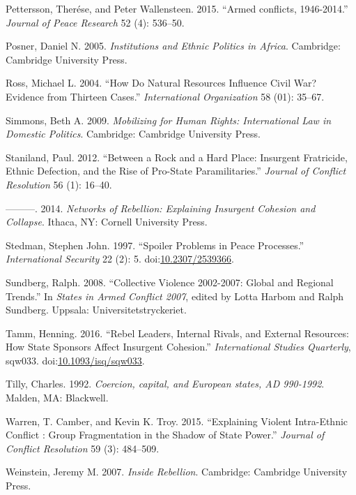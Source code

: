 \documentclass[12pt,]{book}
\theoremstyle{definition}
\theoremstyle{definition}
\theoremstyle{remark}
\begin{document}
\hypertarget{ref-Pettersson2015a}{}
Pettersson, Therése, and Peter Wallensteen. 2015. ``Armed conflicts,
1946-2014.'' \emph{Journal of Peace Research} 52 (4): 536--50.

\hypertarget{ref-Posner2005}{}
Posner, Daniel N. 2005. \emph{Institutions and Ethnic Politics in
Africa}. Cambridge: Cambridge University Press.

\hypertarget{ref-Ross2004e}{}
Ross, Michael L. 2004. ``How Do Natural Resources Influence Civil War?
Evidence from Thirteen Cases.'' \emph{International Organization} 58
(01): 35--67.

\hypertarget{ref-simmons09}{}
Simmons, Beth A. 2009. \emph{Mobilizing for Human Rights: International
Law in Domestic Politics}. Cambridge: Cambridge University Press.

\hypertarget{ref-Staniland2012d}{}
Staniland, Paul. 2012. ``Between a Rock and a Hard Place: Insurgent
Fratricide, Ethnic Defection, and the Rise of Pro-State
Paramilitaries.'' \emph{Journal of Conflict Resolution} 56 (1): 16--40.

\hypertarget{ref-Staniland2014}{}
---------. 2014. \emph{Networks of Rebellion: Explaining Insurgent
Cohesion and Collapse}. Ithaca, NY: Cornell University Press.

\hypertarget{ref-Stedman1997}{}
Stedman, Stephen John. 1997. ``Spoiler Problems in Peace Processes.''
\emph{International Security} 22 (2): 5.
doi:\href{https://doi.org/10.2307/2539366}{10.2307/2539366}.

\hypertarget{ref-Sundberg2008a}{}
Sundberg, Ralph. 2008. ``Collective Violence 2002-2007: Global and
Regional Trends.'' In \emph{States in Armed Conflict 2007}, edited by
Lotta Harbom and Ralph Sundberg. Uppsala: Universitetstryckeriet.

\hypertarget{ref-Tamm2016}{}
Tamm, Henning. 2016. ``Rebel Leaders, Internal Rivals, and External
Resources: How State Sponsors Affect Insurgent Cohesion.''
\emph{International Studies Quarterly}, sqw033.
doi:\href{https://doi.org/10.1093/isq/sqw033}{10.1093/isq/sqw033}.

\hypertarget{ref-Tilly1992}{}
Tilly, Charles. 1992. \emph{Coercion, capital, and European states, AD
990-1992}. Malden, MA: Blackwell.

\hypertarget{ref-Warren2015}{}
Warren, T. Camber, and Kevin K. Troy. 2015. ``Explaining Violent
Intra-Ethnic Conflict : Group Fragmentation in the Shadow of State
Power.'' \emph{Journal of Conflict Resolution} 59 (3): 484--509.

\hypertarget{ref-Weinstein2007}{}
Weinstein, Jeremy M. 2007. \emph{Inside Rebellion}. Cambridge: Cambridge
University Press.
\end{document}
